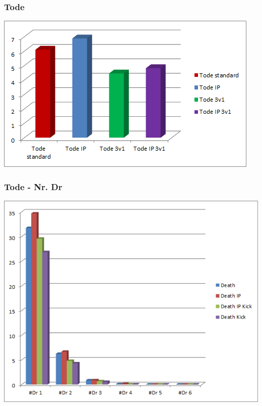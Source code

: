 \documentclass{beamer}
\begin{document}
\begin{frame}
	\frametitle{Tode}
	\begin{center}
		\includegraphics[scale=0.77]{img/Deaths.png}
	\end{center}
\end{frame}

\begin{frame}
	\frametitle{Tode - Nr. Dr}
	\begin{center}
		\includegraphics[scale=0.65]{img/DeathsNrDr.png}
	\end{center}
\end{frame}

\end{document}
